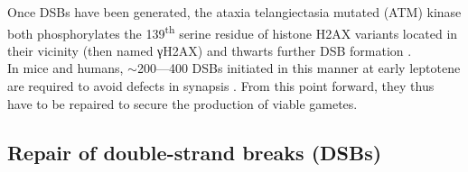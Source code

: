 Once DSBs have been generated, the ataxia telangiectasia mutated (ATM) kinase both phosphorylates the 139\textsuperscript{th} serine residue of histone H2AX variants located in their vicinity (then named \textgreek{γ}H2AX) \citep{rogakou1998dna,burma2001atm} and thwarts further DSB formation \citep{lange2011atm,lukaszewicz2018control}.\\

In mice and humans, ${\sim}$200—400 DSBs initiated in this manner at early leptotene are required to avoid defects in synapsis \citep{kauppi2013numerical,smagulova2013suppression}.
From this point forward, they thus have to be repaired to secure the production of viable gametes.







\subsection{Repair of double-strand breaks (DSBs)}
\label{chap2:DSB-repair}

